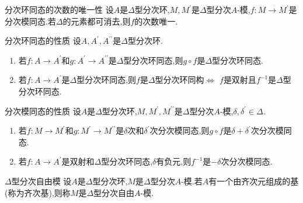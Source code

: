 \begin{proposition}{分次环同态的次数的唯一性}{}
	设$A$是$\Delta$型分次环,$M,M^{\prime}$是$\Delta$型分次$A$-模,$f:M\to M^{\prime}$是分次模同态.若$\Delta$的元素都可消去,则$f$的次数唯一.
\end{proposition}

\begin{proposition}{分次环同态的性质}{}
	设$A,A^{\prime},A^{\prime\prime}$是$\Delta$型分次环.
	\begin{enumerate}
		\item 若$f:A\to A^{\prime}$和$g:A^{\prime}\to A^{\prime\prime}$是$\Delta$型分次环同态,则$g\circ f$是$\Delta$型分次环同态.
		\item 若$f:A\to A^{\prime}$是$\Delta$型分次环同态,则$f$是$\Delta$型分次环同构$\iff$ $f$是双射且$f^{-1}$是$\Delta$型分次环同态.
	\end{enumerate}
\end{proposition}

\begin{proposition}{分次模同态的性质}{}
	设$A$是$\Delta$型分次环,$M,M^{\prime},M^{\prime\prime}$是$\Delta$型分次$A$-模,$\delta,\delta^{\prime}\in\Delta$.
	\begin{enumerate}
		\item 若$f:M\to M^{\prime}$和$g:M^{\prime}\to M^{\prime\prime}$是$\delta$次和$\delta^{\prime}$次分次模同态,则$g\circ f$是$\delta+\delta^{\prime}$次分次模同态.
		\item 若$f:A\to A^{\prime}$是双射和$\Delta$型分次环同态,$\delta$有负元,则$f^{-1}$是$-\delta$次分次模同态.
	\end{enumerate}
\end{proposition}

\begin{definition}{$\Delta$型分次自由模}{}
	设$A$是$\Delta$型分次环,$M$是$\Delta$型分次$A$-模.若$A$有一个由齐次元组成的基(称为齐次基),则称$M$是$\Delta$型分次自由$A$-模.
\end{definition}

